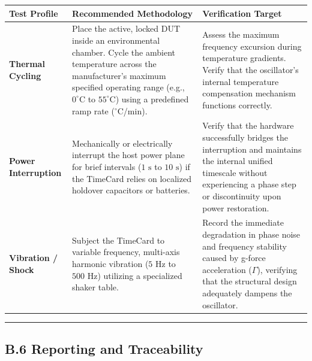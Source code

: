 {\def\LTcaptype{none} %
\begin{longtable}[]{@{}
  >{\raggedright\arraybackslash}p{}
  >{\raggedright\arraybackslash}p{}
  >{\raggedright\arraybackslash}p{}@{}}
\toprule\noalign{}
\begin{minipage}[b]{\linewidth}\raggedright
Test Profile
\end{minipage} & \begin{minipage}[b]{\linewidth}\raggedright
Recommended Methodology
\end{minipage} & \begin{minipage}[b]{\linewidth}\raggedright
Verification Target
\end{minipage} \\
\midrule\noalign{}
\endhead
\bottomrule\noalign{}
\endlastfoot
\textbf{Thermal Cycling} & Place the active, locked DUT inside an
environmental chamber. Cycle the ambient temperature across the
manufacturer's maximum specified operating range (e.g.,
\(0^\circ\text{C}\) to \(55^\circ\text{C}\)) using a predefined ramp
rate (\(^\circ\text{C}\)/min). & Assess the maximum frequency excursion
during temperature gradients. Verify that the oscillator's internal
temperature compensation mechanism functions correctly. \\
\textbf{Power Interruption} & Mechanically or electrically interrupt the
host power plane for brief intervals (\(1\text{ s}\) to \(10\text{ s}\))
if the TimeCard relies on localized holdover capacitors or batteries. &
Verify that the hardware successfully bridges the interruption and
maintains the internal unified timescale without experiencing a phase
step or discontinuity upon power restoration. \\
\textbf{Vibration / Shock} & Subject the TimeCard to variable frequency,
multi-axis harmonic vibration (\(5\text{ Hz}\) to \(500\text{ Hz}\))
utilizing a specialized shaker table. & Record the immediate degradation
in phase noise and frequency stability caused by g-force acceleration
(\(\Gamma\)), verifying that the structural design adequately dampens
the oscillator. \\
\end{longtable}
}

\begin{center}\rule{0.5\linewidth}{0.5pt}\end{center}

\subsection{B.6 Reporting and
Traceability}\label{b.6-reporting-and-traceability}

